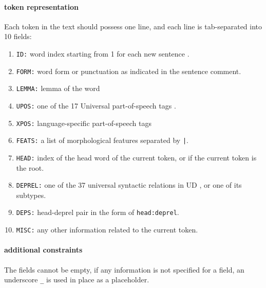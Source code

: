 \paragraph{token representation} 
Each token  in the text should possess one line, and each line is tab-separated into 10 fields:
\begin{enumerate}
	\item \texttt{ID:} word index starting from 1 for each new sentence .
	\item \texttt{FORM:} word form or punctuation as indicated in the sentence comment.
	\item \texttt{LEMMA:} lemma of the word
	\item \texttt{UPOS:} one of the 17 Universal part-of-speech tags .
	\item \texttt{XPOS:} language-specific part-of-speech tags
	\item \texttt{FEATS:} a list of morphological features  separated by \texttt{|}.
	\item \texttt{HEAD:} index of the head word of the current token, or  if the current token is the root.
	\item \texttt{DEPREL:} one of the 37 universal syntactic relations in UD , or one of its subtypes.
	\item \texttt{DEPS:} head-deprel pair in the form of \texttt{head:deprel}.
	\item \texttt{MISC:} any other information related to the current token.
\end{enumerate}
\paragraph{additional constraints} The fields cannot be empty, if any information  is not specified for a field, an underscore \texttt{\_} is used in place as a placeholder.

